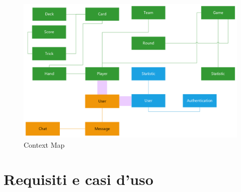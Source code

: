 \begin{figure}[h!]
    \centering 
    \includegraphics[scale=0.45]{report/img/BoundedCTX.png}
    \caption{Context Map}
    \label{bounded_context}
\end{figure}
\newpage
\section{Requisiti e casi d'uso}
